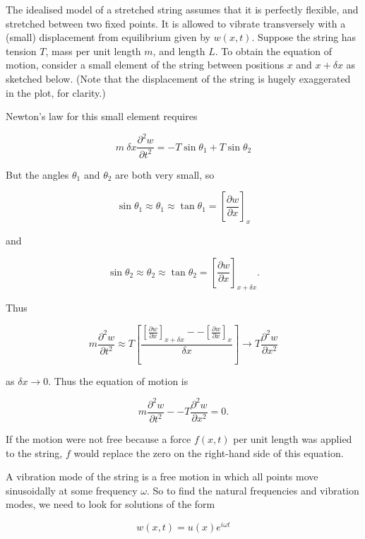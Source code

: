   The idealised model of a stretched string assumes that it is perfectly 
  flexible, and stretched between two fixed points. It is allowed to vibrate 
  transversely with a (small) displacement from equilibrium given by $w(x,t)$. 
  Suppose the string has tension $T$, mass per unit length $m$, and length $L$. 
  To obtain the equation of motion, consider a small element of the string 
  between positions $x$ and $x+ \delta x$ as sketched below. (Note that the 
  displacement of the string is hugely exaggerated in the plot, for clarity.) 


  Newton's law for this small element requires 

  $$m~\delta x \frac{\partial^2 w}{\partial t^2} =-T \sin \theta_1 + T 
  \sin\theta_2 \tag{1}$$ 

  But the angles $\theta_1$ and $\theta_2$ are both very small, so 

  $$\sin \theta_1 \approx \theta_1 \approx \tan \theta_1 = \left[ 
  \frac{\partial w}{\partial x} \right] _x \tag{2}$$ 

  and 

  $$\sin \theta_2 \approx \theta_2 \approx \tan \theta_2 = \left[ 
  \frac{\partial w}{\partial x} \right] _{x + \delta x}. \tag{3}$$ 

  Thus 

  $$m \frac{\partial^2 w}{\partial t^2} \approx T \left[ \dfrac{\left[ 
  \frac{\partial w}{\partial x} \right] _{x + \delta x} -- \left[ 
  \frac{\partial w}{\partial x} \right] _{x} }{\delta x} \right] \rightarrow T 
  \dfrac{\partial^2 w}{\partial x^2} \tag{4}$$ 

  as $\delta x \rightarrow 0$. Thus the equation of motion is 

  $$m \frac{\partial^2 w}{\partial t^2} -- T \dfrac{\partial^2 w}{\partial x^2} 
  =0 . \tag{5}$$ 

  If the motion were not free because a force $f(x,t)$ per unit length was 
  applied to the string, $f$ would replace the zero on the right-hand side of 
  this equation. 

  A vibration mode of the string is a free motion in which all points move 
  sinusoidally at some frequency $\omega$. So to find the natural frequencies 
  and vibration modes, we need to look for solutions of the form 

  $$w(x,t) = u(x) e^{i \omega t} \tag{6}$$ 

